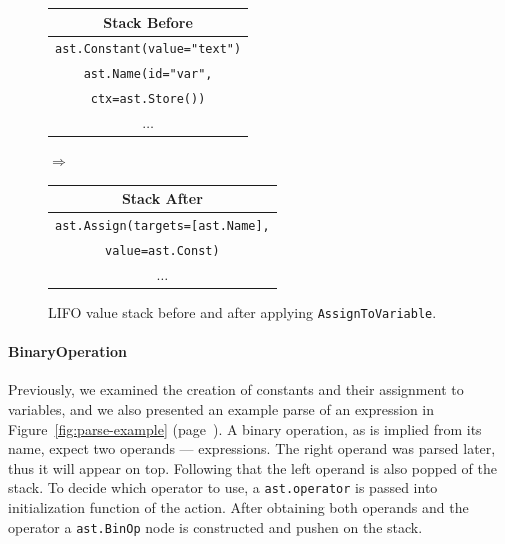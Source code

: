 \begin{figure}[H]\label{fig:assignToVariable-stack}
  \centering
  {\small

  \begin{tabular}{|c|}
    \hline
    \textbf{Stack Before} \\ \hline
    \texttt{\tiny{ast.}}\texttt{Constant(value="text")}\\ \hline
    \texttt{\tiny{ast.}}\texttt{Name(id="var",}\\
    \texttt{ctx=}\texttt{\tiny{ast.}}\texttt{Store())} \\ \hline
    \(\dots\)             \\ \hline
  \end{tabular}
  \hspace{0.25em}$\Longrightarrow$\hspace{0.25em}
  \begin{tabular}{|c|}
    \hline
    \textbf{Stack After} \\ \hline
    \texttt{\tiny{ast.}}\texttt{Assign(targets=[}\texttt{\tiny{ast.}}\texttt{Name],}\\
    \texttt{value=}\texttt{\tiny{ast.}}\texttt{Const)} \\ \hline
    \(\dots\)                       \\ \hline
  \end{tabular}
  }
  \caption{LIFO value stack before and after applying \texttt{AssignToVariable}.}
  
\end{figure}

\paragraph{BinaryOperation}
Previously, we examined the creation of constants and their assignment to variables, and we also presented an example parse of an expression in Figure~\ref{fig:parse-example} (page~\pageref{fig:parse-example}). A binary operation, as is implied from its name, expect two operands --- expressions. The right operand was parsed later, thus it will appear on top. Following that the left operand is also popped of the stack. To decide which operator to use, a \texttt{ast.operator} is passed into initialization function of the action. After obtaining both operands and the operator a \texttt{ast.BinOp} node is constructed and pushen on the stack.

